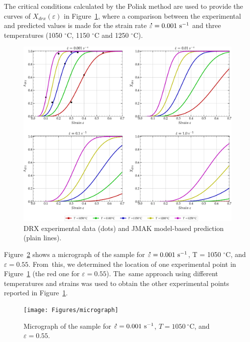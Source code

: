 \documentclass[metals,article,accept,pdftex,moreauthors]{Definitions/mdpi}
\DeclareRobustCommand{\mdot}[1]{\accentset{\mbox{\bfseries .}}{#1}}
\DeclareRobustCommand{\ps}{\text{s}^{-1}}
\begin{document}
The critical conditions calculated by the Poliak method are used to provide the curves of $X_{drx}(\varepsilon)$ in Figure~\ref{fig:nDRX}, where a comparison between the experimental and predicted values is made for the strain rate $\mdot\varepsilon=0.001~\ps$ and three temperatures (1050 $^\circ$C, 1150 $^\circ$C and 1250 $^\circ$C).
\begin{figure}[H]
\centering
	\includegraphics[width=0.99\columnwidth]{Figures/nDRX1}
	\caption{DRX experimental data (dots) and JMAK model-based prediction (plain lines).}
	\label{fig:nDRX}
\end{figure}
Figure~\ref{fig:eDRX} shows a micrograph of the sample for $\mdot\varepsilon=0.001~\ps$, T = 1050 $^\circ$C, and $\varepsilon=0.55$. From~this, we determined the location of one experimental point in Figure~\ref{fig:nDRX} (the red one for $\varepsilon=0.55$). The~same approach using different temperatures and strains was used to obtain the other experimental points reported in Figure~\ref{fig:nDRX}.
\begin{figure}[H]
\centering
	\texttt{[image: Figures/micrograph]}
	\caption{Micrograph of the sample for $\mdot\varepsilon=0.001~\ps$, $T=1050~^\circ$C, and $\varepsilon=0.55$.}
	\label{fig:eDRX}
\end{figure}
\end{document}
